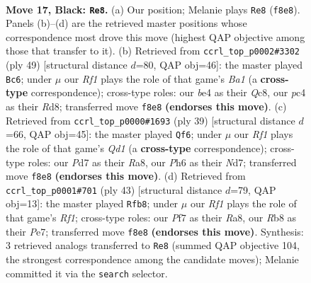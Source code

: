 \documentclass[11pt]{article}
\begin{document}
\clearpage

\begin{figure}[p]\centering
\begin{subfigure}{0.46\textwidth}\centering
\resizebox{\linewidth}{!}{%
\newchessgame
\chessboard[
  setfen={1rbq1rk1/p2pppb1/2p4p/5P1Q/P1P1B3/2N3P1/1P6/R1B2RK1 b - - 0 17},
  showmover=false,
  pgfstyle=straightmove, color=movearrow, markmove={f8-e8}
]}
\caption{}
\end{subfigure}\hfill
\begin{subfigure}{0.46\textwidth}\centering
\resizebox{\linewidth}{!}{%
\newchessgame
\chessboard[
  setfen={b1qrr1k1/p3bpp1/4p2p/2P1B3/Q3p3/p3P2P/5PP1/1RR2BK1 b - - 0 25},
  showmover=false,
  pgfstyle=straightmove, color=movearrow, markmove={a8-c6}
]}
\caption{}
\end{subfigure}
\\[4pt]
\begin{subfigure}{0.46\textwidth}\centering
\resizebox{\linewidth}{!}{%
\newchessgame
\chessboard[
  setfen={r2q2k1/1bpn1rb1/1p4pp/1P6/P1NpP1Q1/B2B4/5PP1/R3R1K1 b - - 2 20},
  showmover=false,
  pgfstyle=straightmove, color=movearrow, markmove={d8-f6}
]}
\caption{}
\end{subfigure}\hfill
\begin{subfigure}{0.46\textwidth}\centering
\resizebox{\linewidth}{!}{%
\newchessgame
\chessboard[
  setfen={r4rk1/4p1bp/pp1q2p1/3bN3/P2Pp3/4B2P/1Q3PP1/1R2R1K1 b - - 1 22},
  showmover=false,
  pgfstyle=straightmove, color=movearrow, markmove={f8-b8}
]}
\caption{}
\end{subfigure}
\caption{\textbf{Move 17, Black: \texttt{Re8}.} (a) Our position; Melanie plays \texttt{Re8} (\texttt{f8e8}). Panels (b)--(d) are the retrieved master positions whose correspondence most drove this move (highest QAP objective among those that transfer to it). (b) Retrieved from \texttt{ccrl\_top\_p0002\#3302} (ply 49) [structural distance $d$=80, QAP obj=46]: the master played \texttt{Bc6}; under $\mu$ our \emph{Rf1} plays the role of that game's \emph{Ba1} (a \textbf{cross-type} correspondence); cross-type roles: our \emph{b}e4 as their \emph{Q}c8, our \emph{p}c4 as their \emph{R}d8; transferred move \texttt{f8e8} \textbf{(endorses this move)}. (c) Retrieved from \texttt{ccrl\_top\_p0000\#1693} (ply 39) [structural distance $d$=66, QAP obj=45]: the master played \texttt{Qf6}; under $\mu$ our \emph{Rf1} plays the role of that game's \emph{Qd1} (a \textbf{cross-type} correspondence); cross-type roles: our \emph{P}d7 as their \emph{R}a8, our \emph{P}h6 as their \emph{N}d7; transferred move \texttt{f8e8} \textbf{(endorses this move)}. (d) Retrieved from \texttt{ccrl\_top\_p0001\#701} (ply 43) [structural distance $d$=79, QAP obj=13]: the master played \texttt{Rfb8}; under $\mu$ our \emph{Rf1} plays the role of that game's \emph{Rf1}; cross-type roles: our \emph{P}f7 as their \emph{R}a8, our \emph{R}b8 as their \emph{P}e7; transferred move \texttt{f8e8} \textbf{(endorses this move)}. Synthesis: 3 retrieved analogs transferred to \texttt{Re8} (summed QAP objective 104, the strongest correspondence among the candidate moves); Melanie committed it via the \texttt{search} selector.}
\label{fig:thought-m33}
\end{figure}
\end{document}
